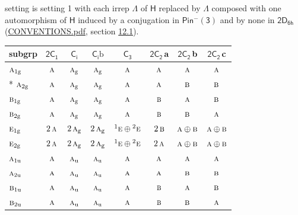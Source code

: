 \documentclass[10pt,a4paper]{article}
\numberwithin{equation}{section}
\newcommand{\grp}[1]{\mathsf{#1}}
\newcommand{\irr}[1]{\text{\normalfont\scshape #1}}
\newcommand{\conjpair}[1]{{}^{#1}}
\newcommand{\ptag}[1]{\mathrm{#1}}
\newcommand{\clsletter}[1]{\,{\scriptsize\color{black!55}#1}}
\newcommand{\secondclass}{\mathrm{b}}
\begin{document}
setting is setting 1 with each irrep $\Lambda$ of $\grp{H}$ replaced by $\Lambda$ composed with one automorphism of $\grp{H}$ induced by a conjugation in \href{Pinminus3.pdf}{$\grp{Pin^{-}(3)}$} and by none in $\grp{2D_{6h}}$ (\href{../../CONVENTIONS.pdf}{CONVENTIONS.pdf}, section \href{../../../rotation/CONVENTIONS.pdf\#conv.12.1}{12.1}).
{\small\begin{longtable}{@{}lccccccc@{}}\toprule
subgrp & \href{2C1.pdf}{$\grp{2C_{1}}$} & \href{S2.pdf}{$\grp{C_{i}}$} & \href{S2b.pdf}{$\grp{C_{i}}\secondclass$} & \href{C3.pdf}{$\grp{C_{3}}$} & \href{2C2.pdf}{$\grp{2C_{2}}$}\clsletter{a} & \href{2C2.pdf}{$\grp{2C_{2}}$}\clsletter{b} & \href{2C2.pdf}{$\grp{2C_{2}}$}\clsletter{c}\\\midrule\endhead
\bottomrule\endfoot\endlastfoot
$\irr{a}_{1\ptag{g}}$ & $\irr{a}$ & $\irr{a}_{\ptag{g}}$ & $\irr{a}_{\ptag{g}}$ & $\irr{a}$ & $\irr{a}$ & $\irr{a}$ & $\irr{a}$\\*
$\irr{a}_{2\ptag{g}}$ & $\irr{a}$ & $\irr{a}_{\ptag{g}}$ & $\irr{a}_{\ptag{g}}$ & $\irr{a}$ & $\irr{a}$ & $\irr{b}$ & $\irr{b}$\\
$\irr{b}_{1\ptag{g}}$ & $\irr{a}$ & $\irr{a}_{\ptag{g}}$ & $\irr{a}_{\ptag{g}}$ & $\irr{a}$ & $\irr{b}$ & $\irr{a}$ & $\irr{b}$\\
$\irr{b}_{2\ptag{g}}$ & $\irr{a}$ & $\irr{a}_{\ptag{g}}$ & $\irr{a}_{\ptag{g}}$ & $\irr{a}$ & $\irr{b}$ & $\irr{b}$ & $\irr{a}$\\
$\irr{e}_{1\ptag{g}}$ & $2\,\irr{a}$ & $2\,\irr{a}_{\ptag{g}}$ & $2\,\irr{a}_{\ptag{g}}$ & $\conjpair{1}\irr{e}\oplus \conjpair{2}\irr{e}$ & $2\,\irr{b}$ & $\irr{a}\oplus \irr{b}$ & $\irr{a}\oplus \irr{b}$\\
$\irr{e}_{2\ptag{g}}$ & $2\,\irr{a}$ & $2\,\irr{a}_{\ptag{g}}$ & $2\,\irr{a}_{\ptag{g}}$ & $\conjpair{1}\irr{e}\oplus \conjpair{2}\irr{e}$ & $2\,\irr{a}$ & $\irr{a}\oplus \irr{b}$ & $\irr{a}\oplus \irr{b}$\\
$\irr{a}_{1\ptag{u}}$ & $\irr{a}$ & $\irr{a}_{\ptag{u}}$ & $\irr{a}_{\ptag{u}}$ & $\irr{a}$ & $\irr{a}$ & $\irr{a}$ & $\irr{a}$\\
$\irr{a}_{2\ptag{u}}$ & $\irr{a}$ & $\irr{a}_{\ptag{u}}$ & $\irr{a}_{\ptag{u}}$ & $\irr{a}$ & $\irr{a}$ & $\irr{b}$ & $\irr{b}$\\
$\irr{b}_{1\ptag{u}}$ & $\irr{a}$ & $\irr{a}_{\ptag{u}}$ & $\irr{a}_{\ptag{u}}$ & $\irr{a}$ & $\irr{b}$ & $\irr{a}$ & $\irr{b}$\\
$\irr{b}_{2\ptag{u}}$ & $\irr{a}$ & $\irr{a}_{\ptag{u}}$ & $\irr{a}_{\ptag{u}}$ & $\irr{a}$ & $\irr{b}$ & $\irr{b}$ & $\irr{a}$\\

\end{longtable}}
\end{document}
